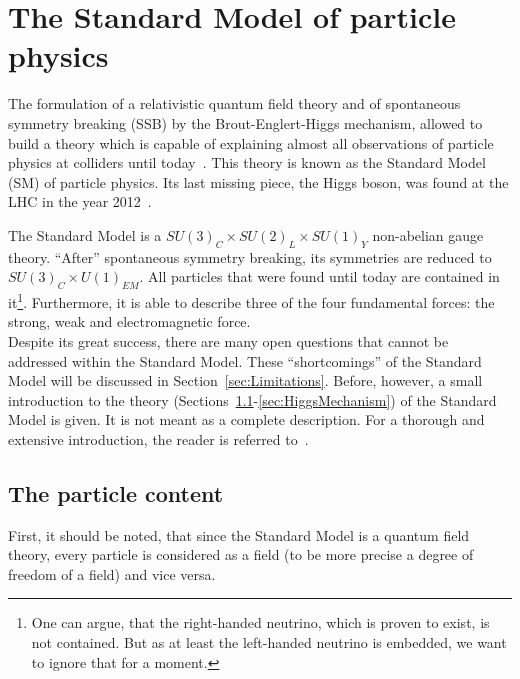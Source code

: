\chapter{The Standard Model of particle physics}

The formulation of a relativistic quantum field theory and of spontaneous symmetry breaking (SSB) by the Brout-Englert-Higgs mechanism, allowed to build a theory which is capable of explaining almost all observations of particle physics at colliders until today~\cite{bib:Theory:GFitter}.
This theory is known as the Standard Model (SM) of particle physics.
Its last missing piece, the Higgs boson, was found at the LHC in the year 2012~\cite{bib:Theory:CMS:HiggsObservation,bib:Theory:Atlas:HiggsObservation}.

The Standard Model is a $SU(3)_C  \times SU(2)_L \times SU(1)_Y$ non-abelian gauge theory.
``After'' spontaneous symmetry breaking, its symmetries are reduced to $SU(3)_C \times U(1)_{EM}$.
All particles that were found until today are contained in it\footnote{One can argue, that the right-handed neutrino, which is proven to exist, is not contained. But as at least the left-handed neutrino is embedded, we want to ignore that for a moment.}.
Furthermore, it is able to describe three of the four fundamental forces: the strong, weak and electromagnetic force.\\

Despite its great success, there are many open questions that cannot be addressed within the Standard Model.
These ``shortcomings'' of the Standard Model will be discussed in Section~\ref{sec:Limitations}.
Before, however, a small introduction to the theory (Sections~\ref{sec:ParticleContent_SM}-\ref{sec:HiggsMechanism}) of the Standard Model is given.
It is not meant as a complete description.
For a thorough and extensive introduction, the reader is referred to~\cite{bib:SM_book_Peskin,bib:SM_book_Ryder,bib:SM_book_Griffiths}. 

\section{The particle content}
\label{sec:ParticleContent_SM}
First, it should be noted, that since the Standard Model is a quantum field theory, every particle is considered as a field (to be more precise a degree of freedom of a field) and vice versa.

